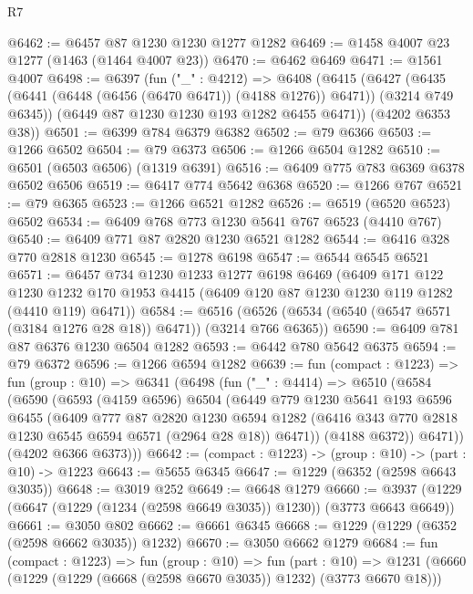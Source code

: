 \begin{lexlean}{R7}
\begin{coremodule}
@6462 := @6457 @87 @1230 @1230 @1277 @1282
@6469 := @1458 @4007 @23 @1277 (@1463 (@1464 @4007 @23))
@6470 := @6462 @6469
@6471 := @1561 @4007
@6498 := @6397
    (fun ("_" : @4212) =>
    @6408
      (@6415
        (@6427 (@6435 (@6441 (@6448 (@6456 (@6470 @6471)) (@4188 @1276)) @6471)) (@3214 @749 @6345))
        (@6449 @87 @1230 @1230 @193 @1282 @6455 @6471))
      (@4202 @6353 @38))
@6501 := @6399 @784 @6379 @6382
@6502 := @79 @6366
@6503 := @1266 @6502
@6504 := @79 @6373
@6506 := @1266 @6504 @1282
@6510 := @6501 (@6503 @6506) (@1319 @6391)
@6516 := @6409 @775 @783 @6369 @6378 @6502 @6506
@6519 := @6417 @774 @5642 @6368
@6520 := @1266 @767
@6521 := @79 @6365
@6523 := @1266 @6521 @1282
@6526 := @6519 (@6520 @6523) @6502
@6534 := @6409 @768 @773 @1230 @5641 @767 @6523 (@4410 @767)
@6540 := @6409 @771 @87 @2820 @1230 @6521 @1282
@6544 := @6416 @328 @770 @2818 @1230
@6545 := @1278 @6198
@6547 := @6544 @6545 @6521
@6571 := @6457
    @734
    @1230
    @1233
    @1277
    @6198
    @6469
    (@6409
      @171
      @122
      @1230
      @1232
      @170
      @1953
      @4415
      (@6409 @120 @87 @1230 @1230 @119 @1282 (@4410 @119) @6471))
@6584 := @6516 (@6526 (@6534 (@6540 (@6547 @6571 (@3184 @1276 @28 @18)) @6471)) (@3214 @766 @6365))
@6590 := @6409 @781 @87 @6376 @1230 @6504 @1282
@6593 := @6442 @780 @5642 @6375
@6594 := @79 @6372
@6596 := @1266 @6594 @1282
@6639 := fun (compact : @1223) =>
  fun (group : @10) =>
  @6341
    (@6498
      (fun ("_" : @4414) =>
      @6510
        (@6584
          (@6590
            (@6593
              (@4159 @6596)
              @6504
              (@6449
                @779
                @1230
                @5641
                @193
                @6596
                @6455
                (@6409
                  @777
                  @87
                  @2820
                  @1230
                  @6594
                  @1282
                  (@6416 @343 @770 @2818 @1230 @6545 @6594 @6571 (@2964 @28 @18))
                  @6471))
              (@4188 @6372))
            @6471))
        (@4202 @6366 @6373)))
@6642 := (compact : @1223) -> (group : @10) -> (part : @10) -> @1223
@6643 := @5655 @6345
@6647 := @1229 (@6352 (@2598 @6643 @3035))
@6648 := @3019 @252
@6649 := @6648 @1279
@6660 := @3937 (@1229 (@6647 (@1229 (@1234 (@2598 @6649 @3035)) @1230)) (@3773 @6643 @6649))
@6661 := @3050 @802
@6662 := @6661 @6345
@6668 := @1229 (@1229 (@6352 (@2598 @6662 @3035)) @1232)
@6670 := @3050 @6662 @1279
@6684 := fun (compact : @1223) =>
  fun (group : @10) =>
  fun (part : @10) =>
  @1231 (@6660 (@1229 (@1229 (@6668 (@2598 @6670 @3035)) @1232) (@3773 @6670 @18)))

\end{coremodule}
\end{lexlean}
